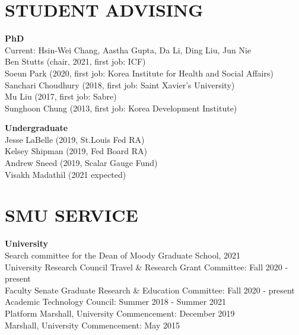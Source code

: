 \documentclass[11pt]{res}
\begin{document}
\begin{resume}
\section{STUDENT ADVISING} \vspace{1.5mm}
\textbf{PhD}\vspace{1.5mm}\\
Current: Hsin-Wei Chang, Aastha Gupta, Da Li, Ding Liu, Jun Nie\vspace{1.5mm}\\
Ben Stutts (chair, 2021, first job: ICF)\vspace{1.5mm}\\
Soeun Park (2020, first job: Korea Institute for Health and Social Affairs)\vspace{1.5mm}\\
Sanchari Choudhury (2018, first job: Saint Xavier's University)\vspace{1.5mm}\\
Mu Liu (2017, first job: Sabre)\vspace{1.5mm}\\
Sunghoon Chung (2013, first job: Korea Development Institute)

\textbf{Undergraduate}\vspace{1.5mm}\\
Jesse LaBelle (2019, St.Louis Fed RA)\vspace{1.5mm}\\
Kelsey Shipman (2019, Fed Board RA)\vspace{1.5mm}\\
Andrew Sneed (2019, Scalar Gauge Fund)\vspace{1.5mm}\\
Visakh Madathil (2021 expected)

\section{SMU SERVICE} \vspace{1.5mm}
\textbf{University}\vspace{1.5mm}\\
Search committee for the Dean of Moody Graduate School, 2021\vspace{1.5mm}\\
University Research Council Travel \& Research Grant Committee: Fall 2020 - present\vspace{1.5mm}\\
Faculty Senate Graduate Research \& Education Committee: Fall 2020 - present\vspace{1.5mm}\\
Academic Technology Council: Summer 2018 - Summer 2021\vspace{1.5mm}\\
Platform Marshall, University Commencement: December 2019\vspace{1.5mm}\\
Marshall, University Commencement: May 2015


\end{resume}
\end{document}
